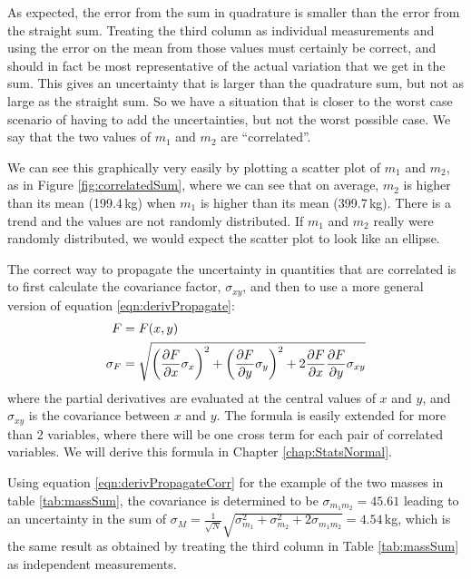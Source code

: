 As expected, the error from the sum in quadrature is smaller than the error from the straight sum. Treating the third column as individual measurements and using the error on the mean from those values must certainly be correct, and should in fact be most representative of the actual variation that we get in the sum. This gives an uncertainty that is larger than the quadrature sum, but not as large as the straight sum. So we have a situation that is closer to the worst case scenario of having to add the uncertainties, but not the worst possible case. We say that the two values of $m_1$ and $m_2$ are ``correlated''. 

We can see this graphically very easily by plotting a scatter plot of $m_1$ and $m_2$, as in Figure \ref{fig:correlatedSum}, where we can see that on average, $m_2$ is higher than its mean (199.4\,kg) when $m_1$ is higher than its mean (399.7\,kg). There is a trend and the values are not randomly distributed. If $m_1$ and $m_2$ really were randomly distributed, we would expect the scatter plot to look like an ellipse. 


The correct way to propagate the uncertainty in quantities that are correlated is to first calculate the covariance factor, $\sigma_{xy}$, and then to use a more general version of equation \ref{eqn:derivPropagate}:
\begin{align}
\label{eqn:derivPropagateCorr}
F&=F(x,y)\nonumber\\
\sigma_F &= \sqrt{\left(\frac{\partial F}{\partial x}\sigma_x\right)^2 + \left(\frac{\partial F}{\partial y} \sigma_y\right)^2+2\frac{\partial F}{\partial x}\frac{\partial F}{\partial y}\sigma_{xy}}
\end{align}
where the partial derivatives are evaluated at the central values of $x$ and $y$, and $\sigma_{xy}$ is the covariance between $x$ and $y$. The formula is easily extended for more than 2 variables, where there will be one cross term for each pair of correlated variables. We will derive this formula in Chapter \ref{chap:StatsNormal}.

Using equation \ref{eqn:derivPropagateCorr} for the example of the two masses in table \ref{tab:massSum}, the covariance is determined to be $\sigma_{m_1m_2}=45.61$ leading to an uncertainty in the sum of $\sigma_M=\frac{1}{\sqrt{N}}\sqrt{\sigma_{m_1}^2+\sigma_{m_2}^2+2\sigma_{m_1m_2}}=4.54$\,kg, which is the same result as obtained by treating the third column in Table \ref{tab:massSum} as independent measurements.

